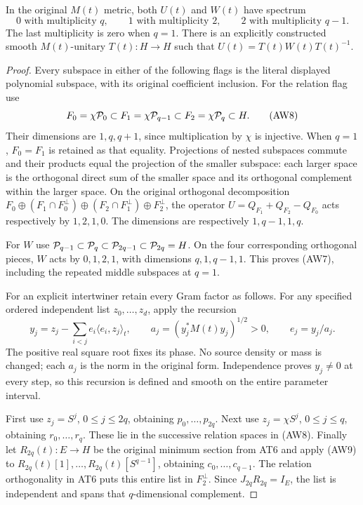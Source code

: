 \begin{theorem}
In the original $M(t)$ metric, both $U(t)$ and $W(t)$ have spectrum
\[
 0\text{ with multiplicity }q,\qquad
 1\text{ with multiplicity }2,\qquad
 2\text{ with multiplicity }q-1.
 \tag{AW7}
\]
The last multiplicity is zero when $q=1$. There is an explicitly
constructed smooth $M(t)$-unitary $T(t):H\to H$ such that
$U(t)=T(t)W(t)T(t)^{-1}$.
\end{theorem}
\begin{proof}
Every subspace in either of the following flags is the literal
displayed polynomial subspace, with its original coefficient inclusion.
For the relation flag use
\[
 F_0=\chi\mathcal P_0\subset F_1=\chi\mathcal P_{q-1}
            \subset F_2=\chi\mathcal P_q\subset H.
 \tag{AW8}
\]
Their dimensions are $1,q,q+1$, since multiplication by $\chi$ is
injective. When $q=1$, $F_0=F_1$ is retained as that equality.
Projections of nested subspaces commute and their products equal
the projection of the smaller subspace: each larger space is the
orthogonal direct sum of the smaller space and its orthogonal
complement within the larger space. On the original orthogonal
decomposition
$F_0\oplus(F_1\cap F_0^\perp)\oplus
(F_2\cap F_1^\perp)\oplus F_2^\perp$, the operator
$U=Q_{F_1}+Q_{F_2}-Q_{F_0}$ acts respectively by $1,2,1,0$.
The dimensions are respectively $1,q-1,1,q$.

For $W$ use
$\mathcal P_{q-1}\subset\mathcal P_q\subset\mathcal P_{2q-1}\subset\mathcal P_{2q}=H$.
On the four corresponding orthogonal pieces, $W$ acts by
$0,1,2,1$, with dimensions $q,1,q-1,1$. This proves (AW7),
including the repeated middle subspaces at $q=1$.

For an explicit intertwiner retain every Gram factor as follows.
For any specified ordered independent list $z_0,\ldots,z_d$,
apply the recursion
\[
 y_j=z_j-\sum_{i<j}e_i\langle e_i,z_j\rangle_t,
 \qquad a_j=(y_j^*M(t)y_j)^{1/2}>0,
 \qquad e_j=y_j/a_j.
 \tag{AW9}
\]
The positive real square root fixes its phase. No source density or
mass is changed; each $a_j$ is the norm in the original form.
Independence proves $y_j\ne0$ at every step, so this recursion is
defined and smooth on the entire parameter interval.

First use $z_j=S^j$, $0\le j\le2q$, obtaining $p_0,\ldots,p_{2q}$.
Next use $z_j=\chi S^j$, $0\le j\le q$, obtaining
$r_0,\ldots,r_q$. These lie in the successive relation spaces
in (AW8). Finally let $R_{2q}(t):E\to H$ be the original minimum
section from AT6 and apply (AW9) to
$R_{2q}(t)[1],\ldots,R_{2q}(t)[S^{q-1}]$, obtaining
$c_0,\ldots,c_{q-1}$. The relation orthogonality in AT6 puts this
entire list in $F_2^\perp$. Since $J_{2q}R_{2q}=I_E$, the list
is independent and spans that $q$-dimensional complement.


\end{proof}
